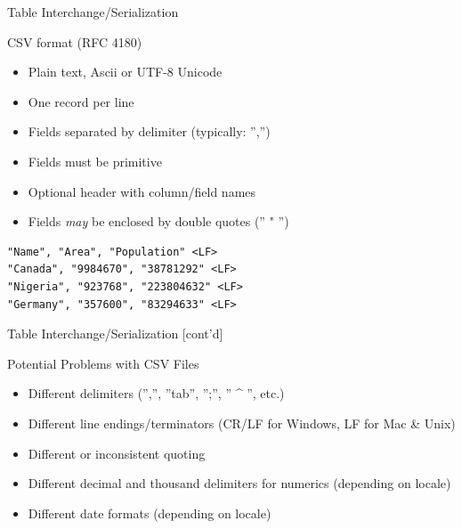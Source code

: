 \documentclass[ignorenonframetext,xcolor=x11names]{beamer}
\begin{document}
\begin{frame}[label=full,fragile]{Table Interchange/Serialization}
\begin{block}{CSV format (RFC 4180)}
\begin{itemize}
	\item Plain text, Ascii or UTF-8 Unicode
	\item One record per line
	\item Fields separated by delimiter (typically: '','')
	\item Fields must be primitive
	\item Optional header with column/field names
	\item Fields \emph{may} be enclosed by double quotes ('' " '')
\end{itemize}
\end{block}

\begin{verbatim}
"Name", "Area", "Population" <LF>
"Canada", "9984670", "38781292" <LF>
"Nigeria", "923768", "223804632" <LF>
"Germany", "357600", "83294633" <LF>
\end{verbatim}
\end{frame}

\begin{frame}[label=full]{Table Interchange/Serialization \small [cont'd]}
\begin{block}{Potential Problems with CSV Files}
\begin{itemize}
	\item Different delimiters ('','', ''tab'', '';'', ''{ }\^{} '', etc.)
	\item Different line endings/terminators (CR/LF for Windows, LF for Mac \& Unix)
	\item Different or inconsistent quoting
	\item Different decimal and thousand delimiters for numerics (depending on locale)
	\item Different date formats (depending on locale)
\end{itemize}
\end{block}
\end{frame}
\end{document}
